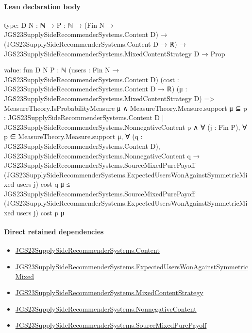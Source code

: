 \documentclass[10pt]{article}
\begin{document}
\paragraph{Lean declaration body}
\begin{ReviewVerbatim}
type:
{D N : ℕ} →
  {P : ℕ} →
    (Fin N → JGS23SupplySideRecommenderSystems.Content D) →
      (JGS23SupplySideRecommenderSystems.Content D → ℝ) →
        JGS23SupplySideRecommenderSystems.MixedContentStrategy D → Prop

value:
fun {D N P : ℕ} (users : Fin N → JGS23SupplySideRecommenderSystems.Content D)
    (cost : JGS23SupplySideRecommenderSystems.Content D → ℝ)
    (μ : JGS23SupplySideRecommenderSystems.MixedContentStrategy D) =>
  MeasureTheory.IsProbabilityMeasure μ ∧
    MeasureTheory.Measure.support μ ⊆
        {p : JGS23SupplySideRecommenderSystems.Content D | JGS23SupplySideRecommenderSystems.NonnegativeContent p} ∧
      ∀ (j : Fin P),
        ∀ p ∈ MeasureTheory.Measure.support μ,
          ∀ (q : JGS23SupplySideRecommenderSystems.Content D),
            JGS23SupplySideRecommenderSystems.NonnegativeContent q →
              JGS23SupplySideRecommenderSystems.SourceMixedPurePayoff
                  (JGS23SupplySideRecommenderSystems.ExpectedUsersWonAgainstSymmetricMixed users j) cost q μ ≤
                JGS23SupplySideRecommenderSystems.SourceMixedPurePayoff
                  (JGS23SupplySideRecommenderSystems.ExpectedUsersWonAgainstSymmetricMixed users j) cost p μ
\end{ReviewVerbatim}

\paragraph{Direct retained dependencies}
\begin{itemize}\raggedright
\item \hyperlink{governing-declaration-367305fda50f0ada}{JGS23\allowbreak{}Supply\allowbreak{}Side\allowbreak{}Recommender\allowbreak{}Systems.\allowbreak{}Content}
\item \hyperlink{governing-declaration-3a110916ca7725ab}{JGS23\allowbreak{}Supply\allowbreak{}Side\allowbreak{}Recommender\allowbreak{}Systems.\allowbreak{}Expected\allowbreak{}Users\allowbreak{}Won\allowbreak{}Against\allowbreak{}Symmetric\allowbreak{}Mixed}
\item \hyperlink{governing-declaration-2089965d06cf0282}{JGS23\allowbreak{}Supply\allowbreak{}Side\allowbreak{}Recommender\allowbreak{}Systems.\allowbreak{}Mixed\allowbreak{}Content\allowbreak{}Strategy}
\item \hyperlink{governing-declaration-d426babe40b9593c}{JGS23\allowbreak{}Supply\allowbreak{}Side\allowbreak{}Recommender\allowbreak{}Systems.\allowbreak{}Nonnegative\allowbreak{}Content}
\item \hyperlink{governing-declaration-d3239873ad21d76c}{JGS23\allowbreak{}Supply\allowbreak{}Side\allowbreak{}Recommender\allowbreak{}Systems.\allowbreak{}Source\allowbreak{}Mixed\allowbreak{}Pure\allowbreak{}Payoff}
\end{itemize}
\hypertarget{governing-declaration-15532aa1b735564f}{}
\end{document}
